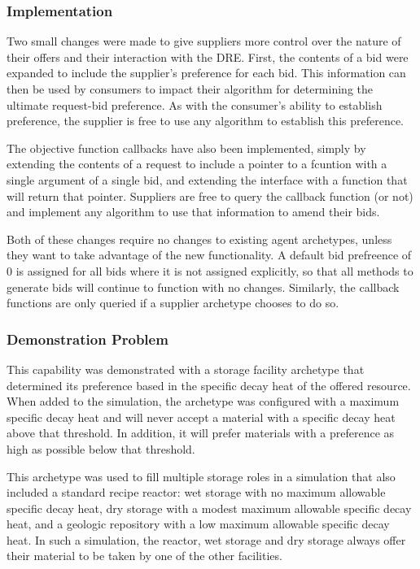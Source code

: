 \subsubsection{Implementation}

Two small changes were made to give suppliers more control over the nature of
their offers and their interaction with the \gls{DRE}.  First, the contents of
a bid were expanded to include the supplier's preference for each bid.  This
information can then be used by consumers to impact their algorithm for
determining the ultimate request-bid preference.  As with the consumer's
ability to establish preference, the supplier is free to use any algorithm to
establish this preference.

The objective function callbacks have also been implemented, simply by
extending the contents of a request to include a pointer to a fcuntion with a
single argument of a single bid, and extending the interface with a function
that will return that pointer.  Suppliers are free to query the callback
function (or not) and implement any algorithm to use that information to amend
their bids.

Both of these changes require no changes to existing agent archetypes, unless
they want to take advantage of the new functionality.  A default bid
prefreence of 0 is assigned for all bids where it is not assigned explicitly,
so that all methods to generate bids will continue to function with no
changes.  Similarly, the callback functions are only queried if a supplier
archetype chooses to do so.


\subsubsection{Demonstration Problem}


This capability was demonstrated with a storage facility archetype that
determined its preference based in the specific decay heat of the offered
resource.  When added to the simulation, the archetype was configured with a
maximum specific decay heat and will never accept a material with a specific
decay heat above that threshold.  In addition, it will prefer materials with a
preference as high as possible below that threshold.

This archetype was used to fill multiple storage roles in a simulation that
also included a standard recipe reactor: wet storage with no maximum allowable
specific decay heat, dry storage with a modest maximum allowable specific
decay heat, and a geologic repository with a low maximum allowable specific
decay heat.  In such a simulation, the reactor, wet storage and dry storage
always offer their material to be taken by one of the other facilities.

